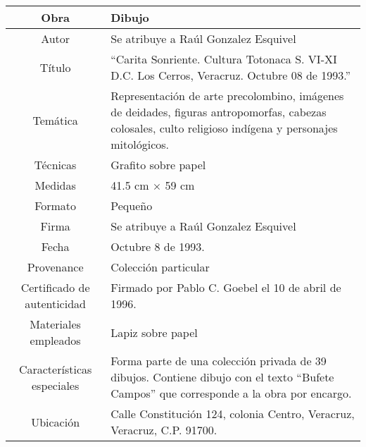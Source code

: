 \begin{table}[H]
\centering
\begin{tabular}{|c|m{}|}
\hline
Obra& Dibujo	\\
\hline
Autor & Se atribuye a Ra\'ul Gonzalez Esquivel\\
\hline
T\'itulo &``Carita Sonriente. Cultura Totonaca S. VI-XI D.C. Los Cerros, Veracruz. Octubre 08 de 1993.'' \\
\hline
Tem\'atica & Representaci\'on de arte precolombino, im\'agenes de deidades, figuras antropomorfas, cabezas colosales, culto religioso ind\'igena y personajes mitol\'ogicos.\\
\hline
T\'ecnicas &Grafito sobre papel \\
\hline
Medidas & 41.5 cm $\times$ 59 cm \\
\hline
 Formato & Peque\~no \\
 \hline
 Firma & Se atribuye a Ra\'ul Gonzalez Esquivel\\ 
 \hline
  Fecha & Octubre 8 de 1993.\\
 \hline
 Provenance & Colecci\'on particular\\
 \hline
 Certificado de autenticidad& Firmado por Pablo C. Goebel el 10 de abril de 1996.  \\
 \hline 
  Materiales empleados & Lapiz sobre papel\\
 \hline
 Caracter\'isticas especiales & Forma parte de una colecci\'on privada de 39 dibujos. 
Contiene dibujo con el texto ``Bufete Campos'' que corresponde a la obra por encargo. \\
\hline 
Ubicaci\'on & Calle Constituci\'on 124, colonia Centro, Veracruz, Veracruz, C.P. 91700.\\
\hline

\end{tabular}
\end{table}

